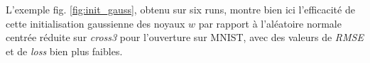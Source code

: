 \vspace{-3.0mm}
\noindent L'exemple fig. \ref{fig:init_gauss}, obtenu sur six runs, montre bien ici l'efficacité de cette initialisation gaussienne des noyaux $w$ par rapport à l'aléatoire normale centrée réduite sur \textit{cross3} pour l'ouverture sur MNIST, avec des valeurs de \textit{RMSE} et de \textit{loss} bien plus faibles.
